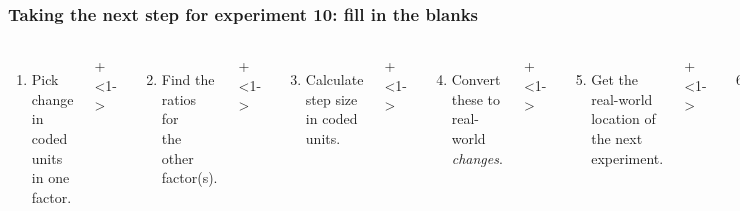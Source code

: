 \begin{frame}\frametitle{Taking the next step for experiment 10: {\color{myOrange}fill in the blanks}}
	\begin{columns}[T]
		
			\vspace{0.1cm}
			{\tiny 
				\begin{enumerate}
					\item	Pick change in coded units in one factor.
				\end{enumerate}
			 \par}
			 
			\onslide+<1->{
				{\tiny 
					\begin{enumerate}\setcounter{enumi}{1}
						\item	Find the ratios for \\the other factor(s).
					\end{enumerate}
				
				\par}
			}
			
			\vspace{0.0cm}
			\onslide+<1->{
				{\tiny 
					\begin{enumerate}\setcounter{enumi}{2}
						\item	Calculate step size in coded units.
					\end{enumerate}
				
				\par}
			}
			
			\onslide+<1->{
				{\tiny 
					\begin{enumerate}\setcounter{enumi}{3}
						\item	Convert these to real-world \emph{changes}.
					\end{enumerate}
				
				\par}
			}
			
			\onslide+<1->{
				{\tiny 
					\begin{enumerate}\setcounter{enumi}{4}
						\item	Get the real-world location
						of the next experiment.
					\end{enumerate}
				
				\par}
			}
			
			
			\vspace{-0.2cm}
			\onslide+<1->{
				{\tiny 
					\begin{enumerate}\setcounter{enumi}{5}
						\item	Convert these back\\ to coded-units.
					\end{enumerate}
				
}}
\end{columns}
\end{frame}
